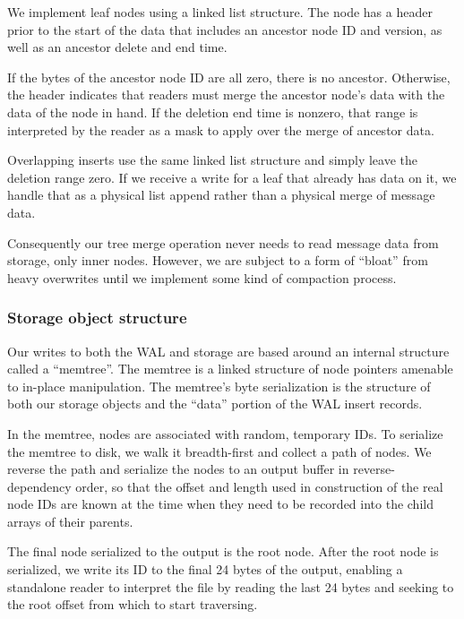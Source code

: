 \documentclass[9pt,twocolumn]{article}
\newcommand{\q}[1]{``#1''}
\begin{document}
    We implement leaf nodes using a linked list structure. The node has a header
    prior to the start of the data that includes an ancestor node ID and version,
    as well as an ancestor delete and end time.

    If the bytes of the ancestor node ID are all zero, there is no ancestor.
    Otherwise, the header indicates that readers must merge the ancestor node’s
    data with the data of the node in hand. If the deletion end time is
    nonzero, that range is interpreted by the reader as a mask to apply over
    the merge of ancestor data.

    Overlapping inserts use the same linked list structure and simply leave the
    deletion range zero. If we receive a write for a leaf that already has data on
    it, we handle that as a physical list append rather than a physical merge of
    message data.

    Consequently our tree merge operation never needs to read message data from
    storage, only inner nodes. However, we are subject to a form of \q{bloat} from
    heavy overwrites until we implement some kind of compaction process.

    \subsubsection{Storage object structure}
    Our writes to both the WAL and storage are based around an internal structure
    called a \q{memtree}. The memtree is a linked structure of node pointers amenable
    to in-place manipulation. The memtree’s byte serialization is the structure of
    both our storage objects and the \q{data} portion of the WAL insert records.

    In the memtree, nodes are associated with random, temporary IDs. To serialize
    the memtree to disk, we walk it breadth-first and collect a path of nodes. We
    reverse the path and serialize the nodes to an output buffer in
    reverse-dependency order, so that the offset and length used in construction of
    the real node IDs are known at the time when they need to be recorded into the
    child arrays of their parents.

    The final node serialized to the output is the root node. After the root node
    is serialized, we write its ID to the final 24 bytes of the output, enabling a
    standalone reader to interpret the file by reading the last 24 bytes and
    seeking to the root offset from which to start traversing.
\end{document}
